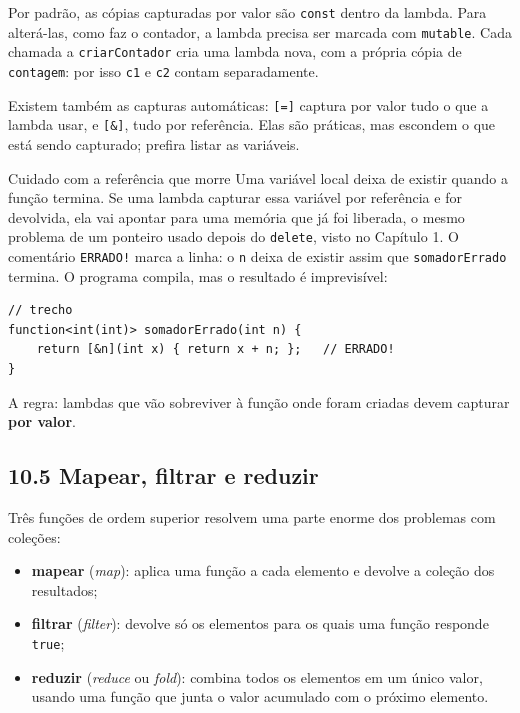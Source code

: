 Por padrão, as cópias capturadas por valor são \texttt{const} dentro da lambda. Para alterá-las, como faz o contador, a lambda precisa ser marcada com \texttt{mutable}. Cada chamada a \texttt{criarContador} cria uma lambda nova, com a própria cópia de \texttt{contagem}: por isso \texttt{c1} e \texttt{c2} contam separadamente.

Existem também as capturas automáticas: \texttt{[=]} captura por valor tudo o que a lambda usar, e \texttt{[\&]}, tudo por referência. Elas são práticas, mas escondem o que está sendo capturado; prefira listar as variáveis.

\begin{destaque}{Cuidado com a referência que morre}
Uma variável local deixa de existir quando a função termina. Se uma lambda capturar essa variável por referência e for devolvida, ela vai apontar para uma memória que já foi liberada, o mesmo problema de um ponteiro usado depois do \texttt{delete}, visto no Capítulo 1. O comentário \texttt{ERRADO!} marca a linha: o \texttt{n} deixa de existir assim que \texttt{somadorErrado} termina. O programa compila, mas o resultado é imprevisível:

\begin{codigo}
\begin{Verbatim}[breaklines=true, breaksymbolleft={}, fontsize=\footnotesize]
// trecho
function<int(int)> somadorErrado(int n) {
    return [&n](int x) { return x + n; };   // ERRADO!
}
\end{Verbatim}
\end{codigo}

A regra: lambdas que vão sobreviver à função onde foram criadas devem capturar \textbf{por valor}.
\end{destaque}

\subsection{10.5 Mapear, filtrar e reduzir}

Três funções de ordem superior resolvem uma parte enorme dos problemas com coleções:

\begin{itemize}
  \item \textbf{mapear} (\textit{map}): aplica uma função a cada elemento e devolve a coleção dos resultados;
  \item \textbf{filtrar} (\textit{filter}): devolve só os elementos para os quais uma função responde \texttt{true};
  \item \textbf{reduzir} (\textit{reduce} ou \textit{fold}): combina todos os elementos em um único valor, usando uma função que junta o valor acumulado com o próximo elemento.
\end{itemize}


